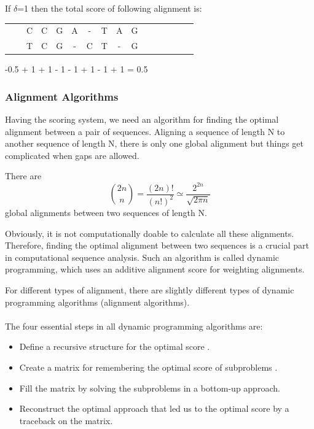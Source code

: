 \documentclass[11pt,a4paper]{report}
\begin{document}
If $\delta$=1 then the total score of following alignment is:
 
\begin{center}
	\begin{tabular}{c *{12}cccc}
        & & C & C & G & A & - & T & A & G && \\
 	  & & T  & C & G &  -  & C   &  T & -  & G & \\
    	                                 
	\end{tabular}
\end{center} 

-0.5 + 1 + 1 - 1 - 1 + 1 - 1 + 1 = 0.5




\subsubsection{Alignment Algorithms} \label{Alignment Algorithms}

Having the scoring system, we need an algorithm for finding the 
optimal alignment between a pair of sequences. 
Aligning a sequence of length N to another sequence of length N,
there is only one global alignment but things get complicated when 
gaps are allowed.
 
There are \cite{durbin}
$$ \binom{2n}{n} = \frac{(2n)!}{(n!)^2} \simeq \frac{2^{2n}}
{\sqrt{2\pi n}} $$
global alignments between two sequences of length N.

Obviously, it is not computationally doable to calculate all these
alignments. Therefore, finding the optimal alignment between two 
sequences is a crucial part in computational sequence analysis.
Such an algorithm is called dynamic programming, which uses an 
additive alignment score for  weighting alignments. 

For different types of alignment, there are slightly different 
types of dynamic programming algorithms (alignment algorithms).\\\\


The four essential steps in all dynamic programming algorithms are:

\begin{itemize} 
	\item Define a recursive structure for the optimal score
	\cite{eddydynamic}.
	\item  Create a  matrix for remembering the optimal score 
	of subproblems \cite{eddydynamic}.	
	\item Fill the matrix by solving the  subproblems in a 
	bottom-up approach\cite{eddydynamic}.
	\item Reconstruct the optimal approach that led us to the 
	optimal score by a traceback on the matrix\cite{eddydynamic}.
\end{itemize}
\end{document}

